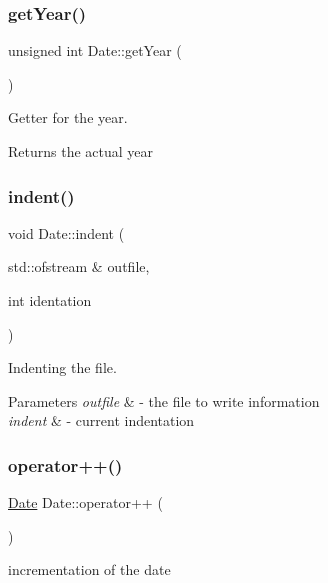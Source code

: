 \subsubsection{\texorpdfstring{get\+Year()}{getYear()}}
{\footnotesize\ttfamily unsigned int Date\+::get\+Year (\begin{DoxyParamCaption}{ }\end{DoxyParamCaption})}



Getter for the year. 

\begin{DoxyReturn}{Returns}
the actual year 
\end{DoxyReturn}
\mbox{\label{class_date_af439b0bc0daf90fddce7c74017407a16}} 
\subsubsection{\texorpdfstring{indent()}{indent()}}
{\footnotesize\ttfamily void Date\+::indent (\begin{DoxyParamCaption}\item[{std\+::ofstream \&}]{outfile,  }\item[{int}]{identation }\end{DoxyParamCaption})}



Indenting the file. 


\begin{DoxyParams}{Parameters}
{\em outfile} & -\/ the file to write information \\
\hline
{\em indent} & -\/ current indentation \\
\hline
\end{DoxyParams}
\mbox{\label{class_date_a0c5386da90c6834a3e7a110b02e2abaa}} 
\subsubsection{\texorpdfstring{operator++()}{operator++()}}
{\footnotesize\ttfamily \mbox{\hyperlink{class_date}{Date}} Date\+::operator++ (\begin{DoxyParamCaption}{ }\end{DoxyParamCaption})}



incrementation of the date 

